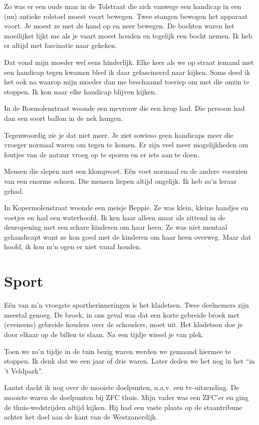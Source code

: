 \documentclass[10pt,twoside,openright]{memoir}
\begin{document}
Zo was er een oude man in de Tolstraat die zich vanwege een handicap in een (nu) antieke rolstoel moest voort bewegen. Twee stangen bewogen het apparaat voort. Je moest ze met de hand op en neer bewegen. De bochten waren het moeilijkst lijkt me als je vaart moest houden en tegelijk een bocht nemen. Ik heb er altijd met fascinatie naar gekeken. 

Dat vond mijn moeder wel eens hinderlijk. Elke keer als we op straat iemand met een handicap tegen kwamen bleef ik daar gefascineerd naar kijken. Soms deed ik het ook na waarop mijn moeder dan me beschaamd toeriep om met die onzin te stoppen. Ik kon naar elke handicap blijven kijken.

In de Rosmolenstraat woonde een mevrouw die een krop had. Die persoon had dan een soort ballon in de nek hangen. 

Tegenwoordig zie je dat niet meer. Je ziet sowieso geen handicaps meer die vroeger normaal waren om tegen te komen. Er zijn veel meer mogelijkheden om foutjes van de natuur vroeg op te sporen en er iets aan te doen.

Mensen die slepen met een klompvoet. Eén voet normaal en de andere voorzien van een enorme schoen. Die mensen liepen altijd ongelijk. Ik heb zo’n leraar gehad.

In Kopermolenstraat woonde een meisje Beppie. Ze was klein, kleine handjes en voetjes en had een waterhoofd. Ik ken haar alleen maar als zittend in de deuropening met een schare kinderen om haar heen. Ze was niet mentaal gehandicapt want ze kon goed met de kinderen om haar heen overweg. Maar dat hoofd, ik kon m’n ogen er niet vanaf houden.

\chapter{Sport} %
\label{cha:sport}

Eén van m’n vroegste sportherinneringen is het kladetsen. Twee deelnemers zijn meestal genoeg. De broek, in ons geval was dat een korte gebreide broek met (eveneens) gebreide houders over de schouders, moet uit. Het kladetsen doe je door elkaar op de billen te slaan. Na een tijdje wissel je van plek. 

Toen we zo’n tijdje in de tuin bezig waren werden we gemaand hiermee te stoppen. Ik denk dat we een jaar of drie waren. Later deden we het nog in het “in ’t Veldpark”. 

Laatst dacht ik nog over de mooiste doelpunten, n.a.v. een tv-uitzending. De mooiste waren de doelpunten bij ZFC thuis. Mijn vader was een ZFC’er en ging de thuis-wedstrijden altijd kijken. Hij had een vaste plaats op de staantribune achter het doel aan de kant van de Westzanerdijk. 
\end{document}
